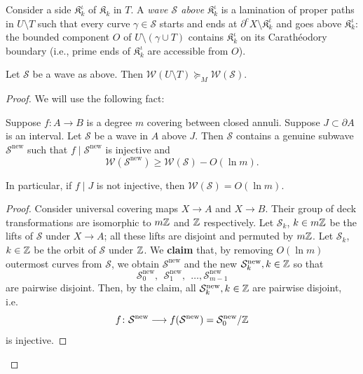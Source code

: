 \documentclass{amsart}
\newcommand{\filled}{{\mathfrak K }}
\renewcommand{\sp}{{\ \ }}
\newcommand{\1}{{\mathbb 1 }}
\newcommand{\FamS}{{\mathcal S}}
\newcommand{\Width}{{\mathcal W}}
\newcommand\new{{\operatorname{new}}}
\begin{document}
Consider a side $\filled_k^\iota$ of $\filled_k$ in $T$. A \emph{wave $\FamS$ above} $\filled_k^\iota$ is a lamination of proper paths in $U\setminus T$ such that every curve $\gamma\in \FamS$ starts and ends at $\partial^cX\setminus \filled_k^\iota$ and goes above $\filled_k^\iota$: the bounded component $O$ of $U\setminus (\gamma\cup T)$ contains $\filled_k^\iota$ on its Carath\'eodory boundary (i.e., prime ends of $\filled_k^\iota$ are accessible from $O$). 

\begin{lem}
\label{lem:Wave}
Let $\FamS$ be a wave as above. Then $\Width(U\setminus T) \succeq_M \Width(\FamS).$
\end{lem}
\begin{proof}
We will use the following fact:
\begin{lem}
\label{lem:WL: removing bugfers}
Suppose $f\colon A\to B$ is a degree $m$ covering between closed annuli. Suppose $J\subset \partial A$ is an interval. Let $\FamS$ be a wave in $A$ above $J$. Then $\FamS$ contains a genuine subwave $\FamS^\new$ such that $ f\mid \FamS^\new$ is injective and \[\Width(\FamS^\new)\ge \Width(\FamS)-O(\ln m).\]
\end{lem}
\noindent In particular, if $f\mid J$ is not injective, then $\Width(\FamS)=O(\ln m)$.
\begin{proof}
Consider universal covering maps $X\to A$ and $X\to B$. Their group of deck transformations are isomorphic to $m{\Bbb Z}$ and ${\Bbb Z}$ respectively. Let $\FamS_{k }$, $k\in m{\Bbb Z}$ be the lifts of $\FamS$ under $X\to A$; all these lifts are disjoint and permuted by $m{\Bbb Z}$. Let $\FamS_{k}$, $k\in {\Bbb Z}$ be the orbit of $\FamS$ under ${\Bbb Z}$. We {\bf claim} that, by removing $O(\ln m)$ outermost curves from $\FamS$, we obtain $\FamS^\new$ and the new $\FamS^\new_k, k\in \Z$ so that \[\FamS^\new_0,\sp \FamS^\new_1,\sp\dots ,\FamS^\new_{m-1}\] are pairwise disjoint. Then, by the claim, all $\FamS^\new_k,k\in \Z$ are pairwise disjoint, i.e.~\[f\colon \FamS^\new\longrightarrow f(\FamS^\new)=\FamS^\new_0/\Z\]
is injective. 


\end{proof}
\end{proof}
\end{document}
